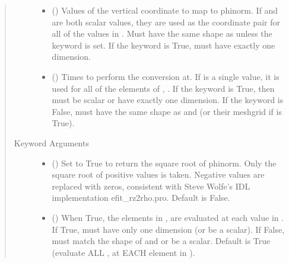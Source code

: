 \documentclass[letterpaper,10pt,english]{sphinxmanual}
\begin{document}
\begin{fulllineitems}
\begin{fulllineitems}
\begin{quote}
\begin{description}
\begin{itemize}
\item {} 
 () \textendash{} Values of the vertical coordinate to
map to phinorm. If  and  are both scalar values,
they are used as the coordinate pair for all of the values in
. Must have the same shape as  unless the 
keyword is set. If the  keyword is True,  must
have exactly one dimension.

\item {} 
 () \textendash{} Times to perform the conversion at.
If  is a single value, it is used for all of the elements of
, . If the  keyword is True, then  must be
scalar or have exactly one dimension. If the  keyword is
False,  must have the same shape as  and  (or their
meshgrid if  is True).

\end{itemize}

\item[{Keyword Arguments}] \leavevmode\begin{itemize}
\item {} 
 () \textendash{} Set to True to return the square root of phinorm.
Only the square root of positive values is taken. Negative
values are replaced with zeros, consistent with Steve Wolfe’s
IDL implementation efit\_rz2rho.pro. Default is False.

\item {} 
 () \textendash{} When True, the elements in ,  are evaluated
at each value in . If True,  must have only one dimension
(or be a scalar). If False,  must match the shape of  and
 or be a scalar. Default is True (evaluate ALL ,  at
EACH element in ).


\end{itemize}
\end{description}
\end{quote}
\end{fulllineitems}
\end{fulllineitems}
\end{document}
